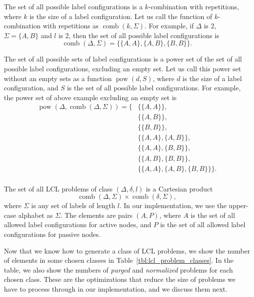 The set of all possible label configurations is a $k$-combination with repetitions, where $k$ is the size of a label configuration.
Let us call the function of $k$-combination with repetitions as $\operatorname{comb}(k, \Sigma)$.
For example, if $\Delta$ is 2, $\Sigma=\{A, B\}$ and $l$ is 2, then the set of all possible label configurations is
$$ \operatorname{comb}(\Delta, \Sigma) = \{ \{A, A\}, \{A, B\}, \{B, B\} \}. $$

The set of all possible sets of label configurations is a power set of the set of all possible label configurations, excluding an empty set.
Let us call this power set without an empty sets as a function $\operatorname{pow}(d, S)$, where $d$ is the size of a label configuration, and $S$ is the set of all possible label configurations.
For example, the power set of above example excluding an empty set is
\begin{align*}
  \operatorname{pow}(\Delta, \operatorname{comb}(\Delta, \Sigma)) =  \{&\{\{A, A\}\}, \\
    &\{\{A, B\}\}, \\
    &\{\{B, B\}\}, \\
    &\{\{A, A\}, \{A, B\}\}, \\
    &\{\{A, A\}, \{B, B\}\}, \\
    &\{\{A, B\}, \{B, B\}\}, \\
    &\{\{A, A\}, \{A, B\}, \{B, B\}\} \}.\\
\end{align*}

The set of all LCL problems of class $(\Delta, \delta, l)$ is a Cartesian product
$$ \operatorname{comb}(\Delta, \Sigma) \times \operatorname{comb}(\delta, \Sigma),$$
where $\Sigma$ is any set of labels of length $l$.
In our implementation, we use the upper-case alphabet as $\Sigma$.
The elements are pairs $(A, P)$, where $A$ is the set of all allowed label configurations for active nodes, and $P$ is the set of all allowed label configurations for passive nodes.

Now that we know how to generate a class of LCL problems, we show the number of elements in some chosen classes in Table~\ref{tbl:lcl_problem_classes}.
In the table, we also show the numbers of \emph{purged} and \emph{normalized} problems for each chosen class.
These are the optimizations that reduce the size of problems we have to process through in our implementation, and we discuss them next.

